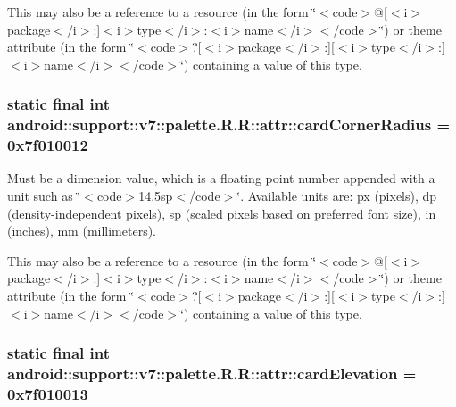 This may also be a reference to a resource (in the form \char`\"{}$<$code$>$@\mbox{[}$<$i$>$package$<$/i$>$:\mbox{]}$<$i$>$type$<$/i$>$:$<$i$>$name$<$/i$>$$<$/code$>$\char`\"{}) or theme attribute (in the form \char`\"{}$<$code$>$?\mbox{[}$<$i$>$package$<$/i$>$:\mbox{]}\mbox{[}$<$i$>$type$<$/i$>$:\mbox{]}$<$i$>$name$<$/i$>$$<$/code$>$\char`\"{}) containing a value of this type. \hypertarget{classandroid_1_1support_1_1v7_1_1palette_1_1_r_1_1attr_86a37a50cabafeab620a6fcff53be391}{
\subsubsection[{cardCornerRadius}]{\setlength{\rightskip}{0pt plus 5cm}static final int android::support::v7::palette.R.R::attr::cardCornerRadius = 0x7f010012}}
\label{classandroid_1_1support_1_1v7_1_1palette_1_1_r_1_1attr_86a37a50cabafeab620a6fcff53be391}


Must be a dimension value, which is a floating point number appended with a unit such as \char`\"{}$<$code$>$14.5sp$<$/code$>$\char`\"{}. Available units are: px (pixels), dp (density-independent pixels), sp (scaled pixels based on preferred font size), in (inches), mm (millimeters). 

This may also be a reference to a resource (in the form \char`\"{}$<$code$>$@\mbox{[}$<$i$>$package$<$/i$>$:\mbox{]}$<$i$>$type$<$/i$>$:$<$i$>$name$<$/i$>$$<$/code$>$\char`\"{}) or theme attribute (in the form \char`\"{}$<$code$>$?\mbox{[}$<$i$>$package$<$/i$>$:\mbox{]}\mbox{[}$<$i$>$type$<$/i$>$:\mbox{]}$<$i$>$name$<$/i$>$$<$/code$>$\char`\"{}) containing a value of this type. \hypertarget{classandroid_1_1support_1_1v7_1_1palette_1_1_r_1_1attr_e9957d15c1e9b76b3e34e24ae14db38b}{
\subsubsection[{cardElevation}]{\setlength{\rightskip}{0pt plus 5cm}static final int android::support::v7::palette.R.R::attr::cardElevation = 0x7f010013}}
\label{classandroid_1_1support_1_1v7_1_1palette_1_1_r_1_1attr_e9957d15c1e9b76b3e34e24ae14db38b}


